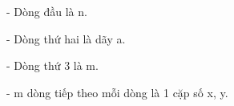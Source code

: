 - Dòng đầu là n.  

   - Dòng thứ hai là dãy a.  

   - Dòng thứ 3 là m.  

   - m dòng tiếp theo mỗi dòng là 1 cặp số x, y.  

\